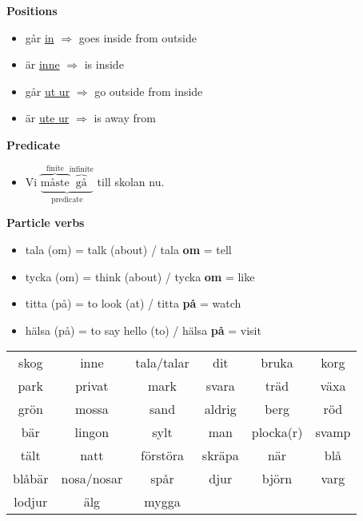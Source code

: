 
\begin{flushleft}
    \textbf{Positions}
    \begin{itemize}
        \item går \underline{in} $\Rightarrow$ goes inside from outside
        \item är \underline{inne} $\Rightarrow$ is inside
        \item går \underline{\underline{ut} ur} $\Rightarrow$ go outside from inside
        \item är \underline{\underline{ute} ur} $\Rightarrow$ is away from
    \end{itemize}

    \textbf{Predicate}
    \begin{itemize}
        \item Vi
        $\underbrace{
            \overbrace{\text{måste}}^{\text{finite}} 
            \overbrace{\text{gå}}^{\text{infinite}}
        }_{\text{predicate}}$
        till skolan nu.
    \end{itemize}

    \textbf{Particle verbs}
    \begin{itemize}
        \item tala (om) = talk (about) / tala \textbf{om} = tell
        \item tycka (om) = think (about) / tycka \textbf{om} = like
        \item titta (på) = to look (at) / titta \textbf{på} = watch
        \item hälsa (på) = to say hello (to) / hälsa \textbf{på} = visit
    \end{itemize}
\end{flushleft}

\begin{center}
    \begin{tabular}{|c c c c c c|}
        \hline
        skog & inne & tala/talar & dit & bruka & korg \\
        park & privat & mark & svara & träd & växa \\
        grön & mossa & sand & aldrig & berg & röd \\
        bär & lingon & sylt & man & plocka(r) & svamp \\
        tält & natt & förstöra & skräpa & när & blå \\
        blåbär & nosa/nosar & spår & djur & björn & varg \\
        lodjur & älg & mygga &  &  &  \\
        \hline
    \end{tabular}
\end{center}

